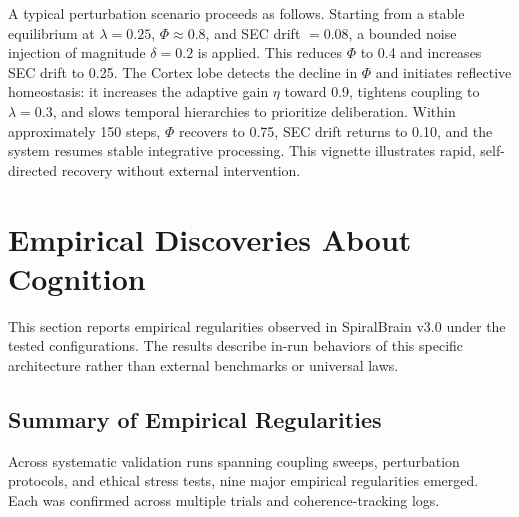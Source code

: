 \documentclass[11pt,a4paper]{article}
\begin{document}
A typical perturbation scenario proceeds as follows. Starting from a stable equilibrium at \( \lambda = 0.25 \), \( \Phi \approx 0.8 \), and SEC drift \( = 0.08 \), a bounded noise injection of magnitude \( \delta = 0.2 \) is applied. This reduces \( \Phi \) to 0.4 and increases SEC drift to 0.25. The Cortex lobe detects the decline in \( \Phi \) and initiates reflective homeostasis: it increases the adaptive gain \( \eta \) toward 0.9, tightens coupling to \( \lambda = 0.3 \), and slows temporal hierarchies to prioritize deliberation. Within approximately 150 steps, \( \Phi \) recovers to 0.75, SEC drift returns to 0.10, and the system resumes stable integrative processing. This vignette illustrates rapid, self-directed recovery without external intervention.

\section{Empirical Discoveries About Cognition}
\label{sec:discoveries}

This section reports empirical regularities observed in SpiralBrain v3.0 under the tested configurations. The results describe in-run behaviors of this specific architecture rather than external benchmarks or universal laws.

\subsection{Summary of Empirical Regularities}

Across systematic validation runs spanning coupling sweeps, perturbation protocols, and ethical stress tests, nine major empirical regularities emerged. Each was confirmed across multiple trials and coherence-tracking logs.
\end{document}
